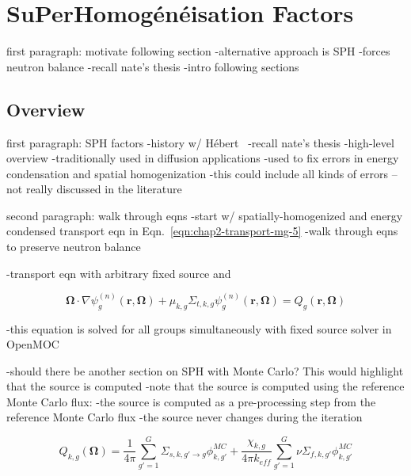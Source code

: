 \section{SuPerHomog\'{e}n\'{e}isation Factors}
\label{sec:chap6-sph}

first paragraph: motivate following section
-alternative approach is SPH
-forces neutron balance
-recall nate's thesis
-intro following sections

\subsection{Overview}
\label{subsec:chap6-sph-overview}

first paragraph: SPH factors
-history w/ H\'{e}bert~\cite{hebert1993consistent}\cite{hebert2005ribon}
-recall nate's thesis
-high-level overview
-traditionally used in diffusion applications
-used to fix errors in energy condensation and spatial homogenization
  -this could include all kinds of errors -- not really discussed in the literature

second paragraph: walk through eqns
-start w/ spatially-homogenized and energy condensed transport eqn in Eqn.~\ref{eqn:chap2-transport-mg-5}
-walk through eqns to preserve neutron balance

-transport eqn with arbitrary fixed source and 

\begin{dmath}
\label{eqn:chap6-sph-transport-eqn}
\mathbf{\Omega} \cdot \nabla \psi_{g}^{(n)}(\mathbf{r},\mathbf{\Omega}) + \mu_{k,g}\Sigma_{t,k,g}\psi_{g}^{(n)}(\mathbf{r},\mathbf{\Omega}) = Q_{g}(\mathbf{r},\mathbf{\Omega})
\end{dmath}

-this equation is solved for all groups simultaneously with fixed source solver in OpenMOC

-should there be another section on SPH with Monte Carlo? This would highlight that the source is computed
-note that the source is computed using the reference Monte Carlo flux:
-the source is computed as a pre-processing step from the reference Monte Carlo flux
-the source never changes during the iteration

\begin{dmath}
\label{eqn:chap6-sph-source}
Q_{k,g}(\mathbf{\Omega}) = \frac{1}{4\pi} \sum_{g'=1}^{G} \Sigma_{s,k,g' \rightarrow g}\phi_{k,g'}^{MC} + \frac{\chi_{k,g}}{4\pi k_{eff}}\sum_{g'=1}^{G} \nu\Sigma_{f,k,g'}\phi_{k,g'}^{MC}
\end{dmath}

